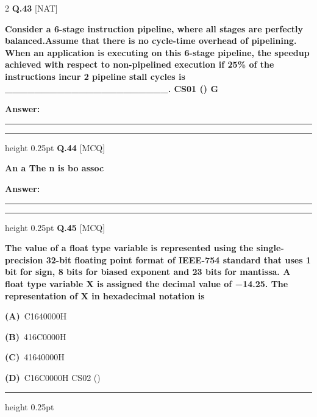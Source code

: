 \documentclass[a4paper,10pt,twoside]{article}
\begin{document}
\begin{multicols}{2}
\noindent\textbf{Q.43} \hfill {\footnotesize\textsf{[NAT]}}
\par\vspace{2pt}
{\bfseries Consider a 6-stage instruction pipeline, where all stages are perfectly balanced.Assume that there is
no cycle-time overhead of pipelining. When an application is executing on this 6-stage pipeline, the
speedup achieved with respect to non-pipelined execution if 25\% of the instructions incur 2
pipeline stall cycles is \_\_\_\_\_\_\_\_\_\_\_\_\_\_\_\_\_\_\_\_\_\_.
CS01 ()
G \par}
\par\vspace{3pt}\noindent\textbf{Answer:} \rule{3.2cm}{0.4pt}
\par\vspace{6pt}\hrule height 0.25pt\vspace{6pt}
\noindent\textbf{Q.44} \hfill {\footnotesize\textsf{[MCQ]}}
\par\vspace{2pt}
{\bfseries An a
The n
is bo
assoc \par}
\par\vspace{3pt}\noindent\textbf{Answer:} \rule{3.2cm}{0.4pt}
\par\vspace{6pt}\hrule height 0.25pt\vspace{6pt}
\noindent\textbf{Q.45} \hfill {\footnotesize\textsf{[MCQ]}}
\par\vspace{2pt}
{\bfseries The value of a float type variable is represented using the single-precision 32-bit floating point
format of IEEE-754 standard that uses 1 bit for sign, 8 bits for biased exponent and 23 bits for
mantissa. A float type variable X is assigned the decimal value of −14.25. The representation of X
in hexadecimal notation is \par}
\par\vspace{2pt}\noindent
\textbf{(A)}~C1640000H\par\vspace{2pt}\noindent
\textbf{(B)}~416C0000H\par\vspace{2pt}\noindent
\textbf{(C)}~41640000H\par\vspace{2pt}\noindent
\textbf{(D)}~C16C0000H \newline CS02 ()
\par\vspace{6pt}\hrule height 0.25pt\vspace{6pt}

\end{multicols}
\end{document}
